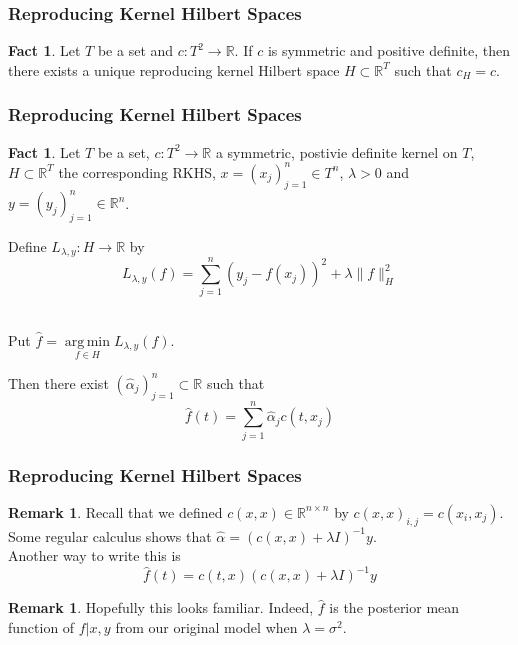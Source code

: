 \documentclass[notheorems]{beamer}
\theoremstyle{definition}
\newtheorem{fact}[definition]{Fact}
\newtheorem{rem}[definition]{Remark}
\newcommand{\al}{\alpha}
\newcommand{\lam}{\lambda}
\newcommand{\sig}{\sigma}
\newcommand{\R}{\mathbb{R}}
\DeclareMathOperator*{\argmin}{arg\,min}
\begin{document}
\begin{frame}
\frametitle{Reproducing Kernel Hilbert Spaces}
\begin{fact}
Let $T$ be a set and $c : T^2 \rightarrow \R$. If $c$ is symmetric and positive definite, then there exists a unique reproducing kernel Hilbert space $H \subset \R^T$ such that $c_H = c$.
\end{fact}

\end{frame}









\begin{frame}
\frametitle{Reproducing Kernel Hilbert Spaces}
\begin{fact}
Let $T$ be a set, $c : T^2 \rightarrow \R$ a symmetric, postivie definite kernel on $T$, $H \subset \R^T$ the corresponding RKHS, $x = (x_j)_{j=1}^n \in T^n$, $\lam > 0$ and $y = (y_j)_{j=1}^n \in \R^n$. \\
\pause

Define $L_{\lam, y}: H \rightarrow \R$ by $$L_{\lam, y}(f) = \sum_{j=1}^n (y_j - f(x_j) )^2 + \lam \|f\|_H^2$$ \\
\pause 

Put $\hat{f} = \argmin\limits_{f \in H}L_{\lam, y}(f)$. 
\\
\pause 

Then there exist $(\hat{\al}_j)_{j=1}^n \subset \R$ such that $$\hat{f}(t) = \sum_{j=1}^n \hat{\al}_jc(t, x_j)$$
\end{fact}
\end{frame}















\begin{frame}
\frametitle{Reproducing Kernel Hilbert Spaces}
\begin{rem}
Recall that we defined $c(x,x) \in \R^{n \times n}$ by $c(x,x)_{i,j} = c(x_i, x_j)$. Some regular calculus shows that $\hat{\al} = (c(x,x) + \lam I)^{-1}y$.\\
Another way to write this is 
$$\hat{f}(t) = c(t,x)(c(x,x) + \lam I)^{-1}y$$
\end{rem}

\begin{rem}
Hopefully this looks familiar. Indeed, $\hat{f}$ is the posterior mean function of $f|x,y$ from our original model when $\lam = \sig^2$.
\end{rem}

\end{frame}
\end{document}
